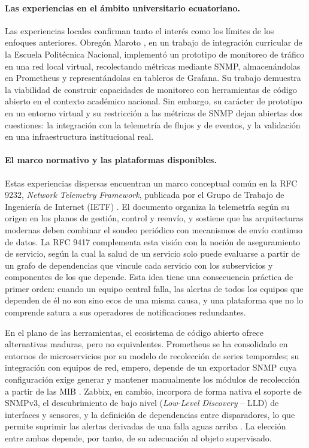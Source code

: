 \paragraph{Las experiencias en el ámbito universitario ecuatoriano.}
Las experiencias locales confirman tanto el interés como los límites de los enfoques anteriores. Obregón Maroto \cite{obregon2026implementacion}, en un trabajo de integración curricular de la Escuela Politécnica Nacional, implementó un prototipo de monitoreo de tráfico en una red local virtual, recolectando métricas mediante SNMP, almacenándolas en Prometheus y representándolas en tableros de Grafana. Su trabajo demuestra la viabilidad de construir capacidades de monitoreo con herramientas de código abierto en el contexto académico nacional. Sin embargo, su carácter de prototipo en un entorno virtual y su restricción a las métricas de SNMP dejan abiertas dos cuestiones: la integración con la telemetría de flujos y de eventos, y la validación en una infraestructura institucional real.

\paragraph{El marco normativo y las plataformas disponibles.}
Estas experiencias dispersas encuentran un marco conceptual común en la RFC 9232, \textit{Network Telemetry Framework}, publicada por el Grupo de Trabajo de Ingeniería de Internet (IETF) \cite{song2022network}. El documento organiza la telemetría según su origen en los planos de gestión, control y reenvío, y sostiene que las arquitecturas modernas deben combinar el sondeo periódico con mecanismos de envío continuo de datos. La RFC 9417 \cite{claise2023sain} complementa esta visión con la noción de aseguramiento de servicio, según la cual la salud de un servicio solo puede evaluarse a partir de un grafo de dependencias que vincule cada servicio con los subservicios y componentes de los que depende. Esta idea tiene una consecuencia práctica de primer orden: cuando un equipo central falla, las alertas de todos los equipos que dependen de él no son sino ecos de una misma causa, y una plataforma que no lo comprende satura a sus operadores de notificaciones redundantes.

En el plano de las herramientas, el ecosistema de código abierto ofrece alternativas maduras, pero no equivalentes. Prometheus se ha consolidado en entornos de microservicios por su modelo de recolección de series temporales; su integración con equipos de red, empero, depende de un exportador SNMP cuya configuración exige generar y mantener manualmente los módulos de recolección a partir de las MIB \cite{prometheus2024docs}. Zabbix, en cambio, incorpora de forma nativa el soporte de SNMPv3, el descubrimiento de bajo nivel (\textit{Low-Level Discovery} -- LLD) de interfaces y sensores, y la definición de dependencias entre disparadores, lo que permite suprimir las alertas derivadas de una falla aguas arriba \cite{zabbix2024manual}. La elección entre ambas depende, por tanto, de su adecuación al objeto supervisado.

